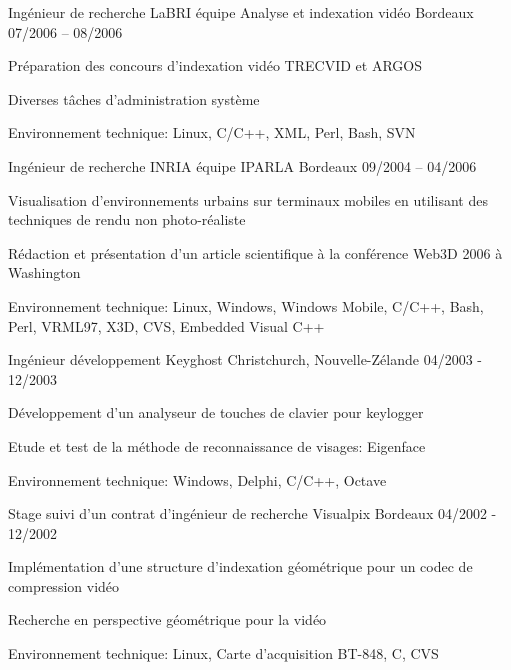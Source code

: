 \begin{cventries}
  \cventry
    {Ingénieur de recherche}
    {LaBRI équipe Analyse et indexation vidéo}
    {Bordeaux}
    {07/2006 – 08/2006}
    {
      \begin{cvitems}
        \item {Préparation des concours d'indexation vidéo TRECVID et ARGOS}
        \item {Diverses tâches d'administration système}
        \item {Environnement technique: Linux, C/C++, XML, Perl, Bash, SVN}
      \end{cvitems}
    }

  \cventry
    {Ingénieur de recherche}
    {INRIA équipe IPARLA}
    {Bordeaux}
    {09/2004 – 04/2006}
    {
      \begin{cvitems}
        \item {Visualisation d'environnements urbains sur terminaux mobiles en
            utilisant des techniques de rendu non photo-réaliste}
        \item {Rédaction et présentation d'un article scientifique à la
            conférence Web3D 2006 à Washington}
        \item {Environnement technique: Linux, Windows, Windows Mobile, C/C++,
            Bash, Perl, VRML97, X3D, CVS, Embedded Visual C++}
      \end{cvitems}
    }

  \cventry
    {Ingénieur développement}
    {Keyghost}
    {Christchurch, Nouvelle-Zélande}
    {04/2003 - 12/2003}
    {
      \begin{cvitems}
        \item {Développement d'un analyseur de touches de clavier pour
            keylogger}
        \item {Etude et test de la méthode de reconnaissance de visages:
            Eigenface}
		\item {Environnement technique: Windows, Delphi, C/C++, Octave}
      \end{cvitems}
    }

  \cventry
    {Stage suivi d'un contrat d'ingénieur de recherche}
    {Visualpix}
    {Bordeaux}
    {04/2002 - 12/2002}
    {
      \begin{cvitems}
        \item {Implémentation d'une structure d'indexation géométrique pour un
            codec de compression vidéo}
        \item {Recherche en perspective géométrique pour la vidéo}
        \item {Environnement technique: Linux, Carte d'acquisition BT-848, C,
            CVS}
      \end{cvitems}
    }


\end{cventries}
